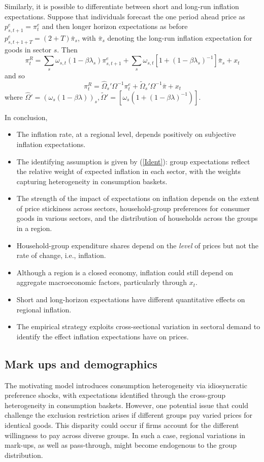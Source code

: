 \documentclass[12pt]{article}
\begin{document}
Similarly, it is possible to differentiate between short and long-run inflation expectations. Suppose that individuals forecast the one period ahead price as $p^e_{s,t+1} = \pi^e_t$ and then longer horizon expectations as before $p^e_{s,t+1+T} = (2+T)\bar{\pi}_s$, with $\bar{\pi}_s$ denoting the long-run inflation expectation for goods in sector $s$. Then
$$ \pi_t^R = \sum_s\omega_{s,t}\left( 1-\beta\lambda_s\right)\pi^e_{s,t+1}+\sum_s\omega_{s,t}\left[1+\left(1-\beta\lambda_s\right)^{-1}\right]\bar{\pi}_s + x_t$$
and so
$$ \pi_t^R = \hat{\Omega}_s'\Omega^{-1}\pi^e_t + \tilde{\Omega}_s'\Omega^{-1}\bar{\pi}+x_t$$
where $\hat{\Omega}'=\left(\omega_s(1-\beta\lambda)\right)_{s}, \tilde{\Omega}' = \left[ \omega_s\left( 1+(1-\beta\lambda )^{-1}\right)\right]$.

In conclusion,
\begin{itemize}
\item The inflation rate, at a regional level, depends positively on subjective inflation expectations.
\item The identifying assumption is given by (\ref{Ident}): group expectations reflect the relative weight of expected inflation in each sector, with the weights capturing heterogeneity in consumption baskets.
\item The strength of the impact of expectations on inflation depends on the extent of price stickiness across sectors, household-group preferences for consumer goods in various sectors, and the distribution of households across the groups in a region.
\item Household-group expenditure shares depend on the \emph{level} of prices but not the rate of change, i.e., inflation.
\item Although a region is a closed economy, inflation could still depend on aggregate macroeconomic factors, particularly through $x_t$. 
\item Short and long-horizon expectations have different quantitative effects on regional inflation.
\item The empirical strategy exploits cross-sectional variation in sectoral demand to identify the effect inflation expectations have on prices.
\end{itemize}

\subsection{Mark ups and demographics}\label{subsec:markups}

The motivating model introduces consumption heterogeneity via idiosyncratic preference shocks, with expectations identified through the cross-group heterogeneity in consumption baskets. However, one potential issue that could challenge the exclusion restriction arises if different groups pay varied prices for identical goods. This disparity could occur if firms account for the different willingness to pay across diverse groups. In such a case, regional variations in mark-ups, as well as pass-through, might become endogenous to the group distribution.
\end{document}
